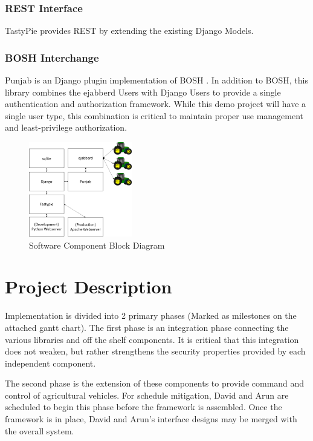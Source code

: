 \documentclass[conference,12pt]{IEEEtran}
\begin{document}
\subsubsection{REST Interface}
TastyPie provides REST \autocite{_toastdriven/django-tastypie_2014} by extending
the existing Django Models.
\subsubsection{BOSH Interchange}
Punjab is an Django plugin implementation of BOSH
\autocite{_twonds/punjab_2014}.  In addition to BOSH, this library combines
the ejabberd Users with Django Users to provide a single authentication and
authorization framework. While this demo project will have a single user type,
this combination is critical to maintain proper use management and
least-privilege authorization.

\begin{figure}
\centering
\includegraphics[width=0.4\textwidth]{SoftwareComponentBlockDiagram.pdf}
\caption{Software Component Block Diagram}
\label{fig:softwarecomponents}
\end{figure}

\section{Project Description}
Implementation is divided into 2 primary phases (Marked as milestones on the
attached gantt chart).  The first phase is an integration phase connecting
the various libraries and off the shelf components. It is critical that this
integration does not weaken, but rather strengthens the security properties
provided by each independent component. 

The second phase is the extension of these components to provide command and
control of agricultural vehicles. For schedule mitigation, David and Arun are
scheduled to begin this phase before the framework is assembled. Once the
framework is in place, David and Arun's interface designs may be merged with the
overall system. 
\end{document}
